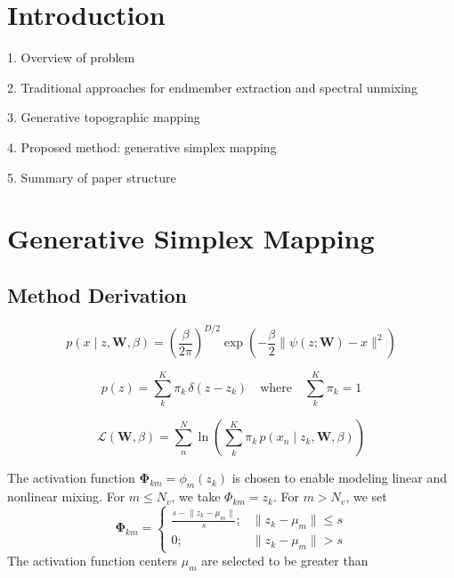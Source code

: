 \documentclass[remotesensing,article,submit,pdftex,moreauthors]{Definitions/mdpi}
\begin{document}

\section{Introduction}

1. Overview of problem

2. Traditional approaches for endmember extraction and spectral unmixing

3. Generative topographic mapping

4. Proposed method: generative simplex mapping

5. Summary of paper structure

\newpage

\section{Generative Simplex Mapping}
\subsection{Method Derivation}

\begin{equation}\label{eqn:data-space-distribution}
    p(x \mid z, \mathbf{W}, \beta) = \left(\frac{\beta}{2\pi} \right)^{D/2}\exp\left( -\frac{\beta}{2}\lVert \psi(z; \mathbf{W}) - x \rVert^2 \right)
\end{equation}

\begin{equation}\label{eqn:latent-distribution}
    p(z) = \sum\limits_k^K \pi_k \, \delta(z - z_k) \quad\text{where}\quad  \sum_k^K\pi_k = 1
\end{equation}

\begin{equation}\label{eqn:llh}
    \mathcal{L}(\mathbf{W}, \beta) = \sum\limits_n^N \ln \left( \sum\limits_k^K \pi_k \, p(x_n \mid z_k, \mathbf{W}, \beta) \right)
\end{equation}

The activation function $\mathbf{\Phi}_{km} = \phi_m(z_k)$ is chosen to enable modeling linear and nonlinear mixing. For $m \leq N_v$, we take $\Phi_{km} = z_k$. For $m > N_v$, we set
\begin{equation}\label{eq:act-function}
    \mathbf{\Phi}_{km} = \begin{cases}
        \frac{s - \lVert z_k - \mu_m \rVert}{s}; & \lVert z_k - \mu_m \rVert \leq s \\
        0; & \lVert z_k - \mu_m \rVert > s
    \end{cases}
\end{equation}
The activation function centers $\mu_m$ are selected to be greater than 
\end{document}
